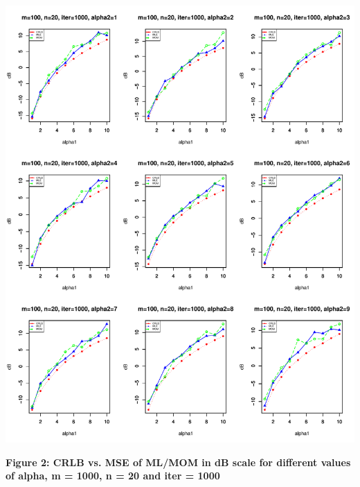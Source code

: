 \documentclass{article} %
\newcommand{\?}{\stackrel{?}{=}}
\begin{document}
\includegraphics[scale=0.8]{plt_n100_m20_ik2.pdf}
\begin{center}
\textbf{Figure 2: CRLB vs. MSE of ML/MOM in dB scale for different values of alpha, m = 1000, n = 20 and iter = 1000}
\end{center}
\end{document}
